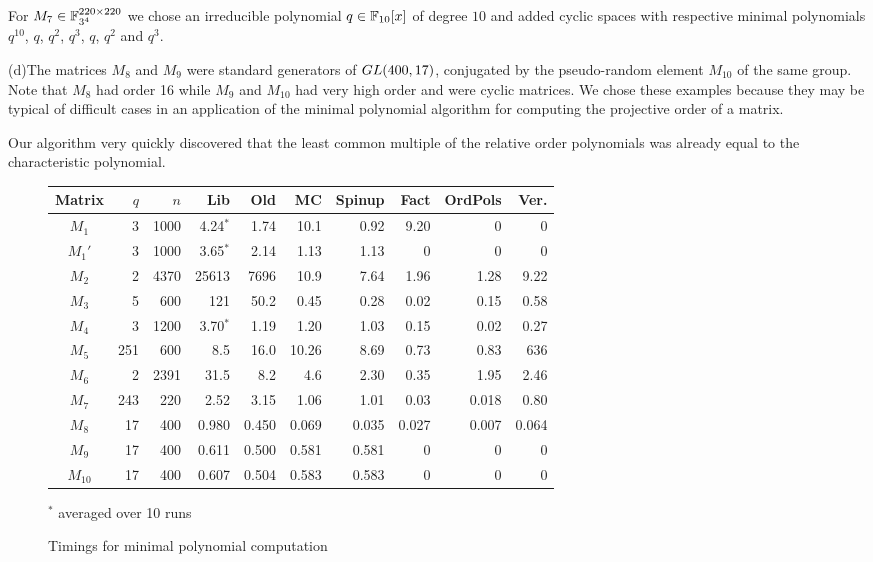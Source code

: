 For $M_7 \in \mathbb{F}_{3^4}^{220 \times 220}$ we chose an irreducible polynomial
$q \in \mathbb{F}_{10}[x]$ of degree $10$ and added cyclic spaces with
respective minimal polynomials $q^{10}$, $q$, $q^2$, $q^3$, $q$, $q^2$ and
$q^3$.

(d)\quad The matrices $M_8$ and $M_9$ were standard generators of 
${\rm GL}(400,17)$, 
conjugated by the pseu\-do-random element $M_{10}$ of the same group.
Note that $M_8$ had
order 16 while $M_9$ and $M_{10}$ had very high order and were cyclic 
matrices. We chose these examples because they may be typical of 
difficult cases in an application of the minimal polynomial algorithm
for computing the projective order of a matrix. 

Our algorithm %
very quickly discovered that the least common multiple of the relative order
polynomials was already equal to the characteristic polynomial.

\begin{figure}
\begin{center}
\begin{tabular}{|c|r|r|r|r|r|r|r|r|r|}
\hline
Matrix & $q$ & $n$ & Lib & Old & MC & Spinup & Fact & OrdPols & Ver. \\
\hline
\hline
$M_1$  & 3   & 1000 & 4.24$^*$ & 1.74 & 10.1 & 0.92 & 9.20 & 0 & 0 \\
$M_1'$ & 3   & 1000 & 3.65$^*$ & 2.14 & 1.13 & 1.13 & 0 & 0 & 0 \\
$M_2$  & 2   & 4370 & 25613 & 7696 & 10.9 & 7.64 & 1.96 & 1.28 & 9.22 \\
$M_3$  & 5   &  600 & 121 & 50.2 & 0.45 & 0.28 & 0.02 & 0.15 & 0.58 \\
$M_4$  & 3   & 1200 & 3.70$^*$& 1.19 & 1.20 & 1.03 & 0.15 & 0.02 & 0.27 \\
$M_5$  & 251 &  600 & 8.5 &16.0& 10.26 & 8.69 & 0.73 & 0.83 & 636 \\ 
$M_6$  & 2   & 2391 & 31.5& 8.2& 4.6  & 2.30 & 0.35 & 1.95 & 2.46 \\
$M_7$  & 243 &  220 & 2.52 & 3.15& 1.06 & 1.01 & 0.03 & 0.018 & 0.80 \\
$M_8$  & 17  &  400 & 0.980 & 0.450  & 0.069 & 0.035 & 0.027 & 0.007 & 0.064 \\
$M_9$  & 17  &  400 & 0.611 & 0.500 & 0.581 & 0.581 & 0 & 0 & 0 \\
$M_{10}$& 17  &  400 & 0.607 & 0.504 & 0.583 & 0.583 & 0 & 0 & 0 \\
\hline
\end{tabular}

\medskip
$^*$ averaged over 10 runs
\end{center}
\caption{Timings for minimal polynomial computation}
\label{timings}
\end{figure}

